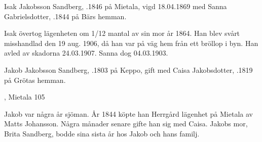 Isak Jakobsson Sandberg, .1846 på Mietala, vigd 18.04.1869 med Sanna Gabrielsdotter, .1844 på Bärs hemman.
\begin{jhchildren}
  \item {}
  \item {}
  \item {}
  \item {}
  \item {}
  \item {}
  \item {}
\end{jhchildren}

Isak övertog lägenheten om 1/12 mantal av sin mor år 1864. Han blev svårt misshandlad den 19 aug. 1906, då han var på väg hem från ett bröllop i byn. Han avled av skadorna 24.03.1907. Sanna dog 04.03.1903.


Jakob Jakobsson Sandberg, .1803 på Keppo, gift med Caisa Jakobsdotter, .1819 på Grötas hemman.
\begin{jhchildren}
  \item {}
  \item {}
  \item {}
  \item {}, Mietala 105
  \item {}
  \item {}
\end{jhchildren}

Jakob var några år sjöman. År 1844 köpte han Herrgård lägenhet på Mietala av Matts Johansson. Några månader senare gifte han sig med Caisa. Jakobs mor, Brita Sandberg, bodde sina sista år hos Jakob och hans familj.

